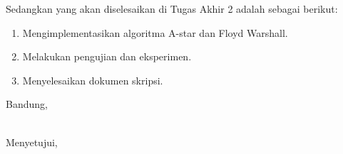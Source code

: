 \documentclass[a4paper,twoside]{article}
\begin{document}
	Sedangkan yang akan diselesaikan di Tugas Akhir 2 adalah sebagai berikut:
    	\begin{enumerate}
    		\item Mengimplementasikan algoritma A-star dan Floyd Warshall.
    		\item Melakukan pengujian dan eksperimen.
    		\item Menyelesaikan dokumen skripsi.
    	\end{enumerate}
	
	\vspace{1cm}
	\centering Bandung, \tanggal\\
	\vspace{2cm} \nama \\ 
	\vspace{1cm}
	
	Menyetujui, \\
\end{document}
